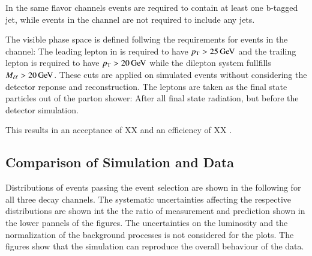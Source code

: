 In the same flavor channels events are required to contain at least one b-tagged jet, while events in the \emu channel are not required to include any jets.

The visible phase space is defined follwing the requirements for events in the \emu channel: The leading lepton in \pt is required to have $p_{\mathrm{T}} > 25 \,\text{Ge\hspace{-.08em}V}$ and the trailing lepton is required to have $p_{\mathrm{T}} > 20 \,\text{Ge\hspace{-.08em}V}$ while the dilepton system fullfills $M_{\ell\ell} > 20 \,\text{Ge\hspace{-.08em}V}$. These cuts are applied on simulated events without considering the detector reponse and reconstruction. The leptons are taken as the final state particles out of the parton shower:
After all final state radiation, but before the detector simulation.

This results in an acceptance of XX and an efficiency of XX .

\subsection{Comparison of Simulation and Data}
\label{sec:xsec_datamc}

Distributions of events passing the event selection are shown in the following for all three decay channels. 
The systematic uncertainties affecting the respective distributions are shown int the the ratio of measurement and prediction shown in the lower pannels of the figures. 
The uncertainties on the luminosity and the normalization of the background processes is not considered for the plots.
The figures show that the simulation can reproduce the overall behaviour of the data. 

